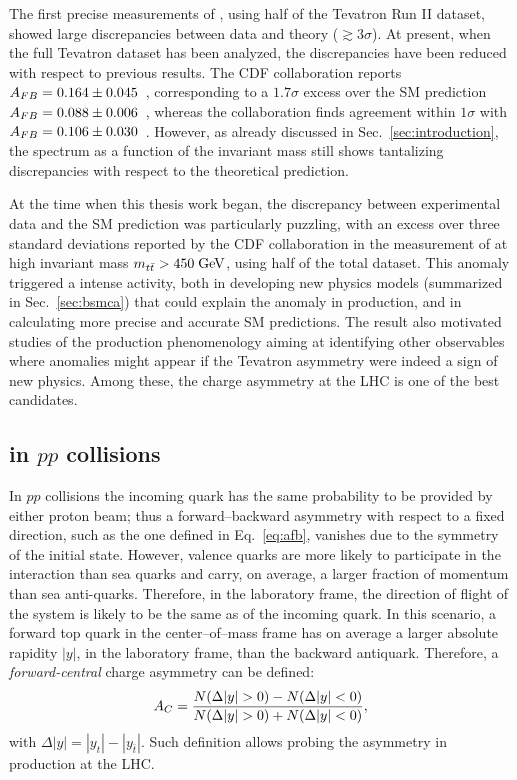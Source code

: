 The first precise measurements of \afb, using half
of the Tevatron Run II dataset, showed large discrepancies between
data and theory ($\gtrsim 3\sigma$).
At present, when the full Tevatron dataset has been analyzed, the
discrepancies have been reduced with respect to previous results. The
CDF collaboration reports \mbox{$A_{FB}=0.164\pm0.045$}~\cite{Aaltonen:2012it},
corresponding to a $1.7\sigma$ excess over the SM prediction \mbox{$A_{FB}{} =
0.088\pm{}0.006$}~\cite{Bernreuther:2012sx}, whereas the \dzero{} collaboration
finds agreement within $1\sigma$ with
\mbox{$A_{FB}{}=0.106\pm0.030$}~\cite{Abazov:2014cca}. However, as
already discussed in Sec.~\ref{sec:introduction}, the \afb{} spectrum as a
function of the \ttbar{} invariant mass \mtt{} still shows tantalizing
discrepancies with respect to the theoretical prediction.

At the time when this thesis work began, the discrepancy between
experimental data and the SM prediction was particularly puzzling,
with an excess over three standard deviations reported by the CDF
collaboration in the measurement of \afb{} at high \ttbar{} invariant
mass $m_{t\bar{t}}{}>450\; \mathrm{GeV}{}$, using half of the total dataset. This anomaly
triggered a intense activity, both in developing new physics models
(summarized in Sec.~\ref{sec:bsmca})
that could explain the anomaly in \ttbar{} production, and in
calculating more precise and accurate SM predictions. The result also
motivated studies of the \ttbar{} production phenomenology aiming at
identifying other observables where anomalies might appear if the
Tevatron asymmetry were indeed a sign of new physics. Among these, the
charge asymmetry at the LHC is one of the best candidates. 

\subsection{\ac{} in $pp$ collisions}

In $pp$ collisions the incoming quark has the same probability to be provided by
either proton beam; thus a forward--backward asymmetry with respect to
a fixed direction, such as the one defined in Eq.~\ref{eq:afb},
vanishes due to the symmetry of the initial state. However, valence
quarks are more likely to participate in the interaction than sea
quarks and carry, on average, a larger fraction of momentum than sea
anti-quarks. Therefore, in the laboratory frame, the direction of
flight of the \ttbar{} system is likely to be the same as of the
incoming quark. In this scenario, a forward top quark in the \ttbar{}
center--of--mass frame has on average a larger absolute rapidity
$|y|$, in the laboratory frame, than the backward antiquark.
Therefore, a {\it forward-central} charge asymmetry \ac{} can be defined:
\begin{equation}
\label{eq:ac}
\ac{}=\frac{N(\Delta{}|y|>0)-N(\Delta{}|y|<0)}{N(\Delta{}|y|>0)+N(\Delta{}|y|<0)},
\end{equation}
with $\Delta{}|y|=|y_t| - |y_{\bar{t}}|$.
Such definition allows probing the asymmetry in \ttbar{} production at the LHC.


